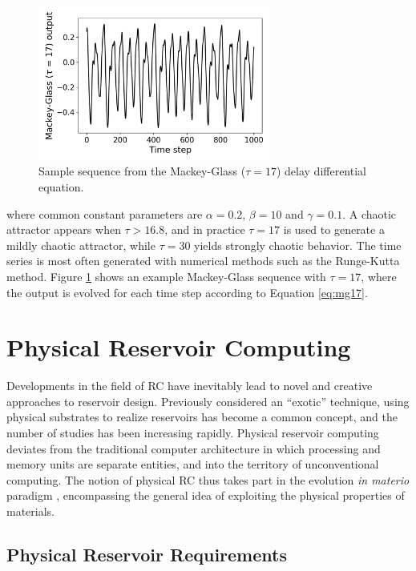 \begin{figure}[t!]
  \centering
  \includegraphics[width=3.0in]{figures/mg17-example.png}
  \caption{
    Sample sequence from the Mackey-Glass ($\tau = 17$) delay differential
equation.
  }
  \label{fig:mg17-example}
\end{figure}

where common constant parameters are $\alpha = 0.2$, $\beta = 10$ and $\gamma =
0.1$. A chaotic attractor appears when $\tau > 16.8$, and in practice $\tau =
17$ is used to generate a mildly chaotic attractor, while $\tau = 30$ yields
strongly chaotic behavior. The time series is most often generated with
numerical methods such as the Runge-Kutta method. Figure \ref{fig:mg17-example}
shows an example Mackey-Glass sequence with $\tau = 17$, where the output is
evolved for each time step according to Equation \ref{eq:mg17}.

\section{Physical Reservoir Computing}
\label{sec:prc}

Developments in the field of RC have inevitably lead to novel and creative
approaches to reservoir design. Previously considered an ``exotic'' technique,
using physical substrates to realize reservoirs has become a common concept, and
the number of studies has been increasing rapidly. Physical reservoir computing
deviates from the traditional computer architecture in which processing and
memory units are separate entities, and into the territory of unconventional
computing. The notion of physical RC thus takes part in the evolution \textit{in
materio} paradigm \cite{miller_evolution_2002}, encompassing the general idea of
exploiting the physical properties of materials.

\subsection{Physical Reservoir Requirements}
\label{ssec:physreq}

